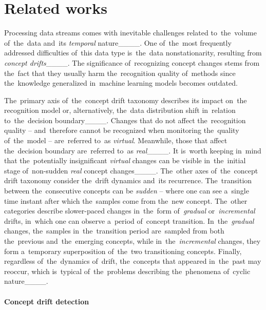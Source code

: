 \section{Related works}
\label{sec-related}

Processing data streams comes with inevitable challenges related to~the~volume of~the~data and~its \textit{temporal} nature____. One of~the~most frequently addressed difficulties of~this data type is~the~data nonstationarity, resulting from \textit{concept drifts}____. The significance of~recognizing concept changes stems from the~fact that they usually harm the~recognition quality of~methods since the~knowledge generalized in~machine learning models becomes outdated. 

The~primary axis of~the~concept drift taxonomy describes its impact on~the recognition model or, alternatively, the~data distribution shift in~relation to~the~decision boundary____. Changes that do not affect the~recognition quality -- and~therefore cannot be recognized when monitoring the~quality of~the~model -- are~referred to~as \textit{virtual}. Meanwhile, those that affect the~decision boundary are~referred to~as \textit{real}____. It is~worth keeping in~mind that the~potentially insignificant \textit{virtual} changes can be visible in~the~initial stage of~non-sudden \textit{real} concept changes____. The~other axes of~the~concept drift taxonomy consider the~drift dynamics and~its recurrence. The~transition between the~consecutive concepts can be \textit{sudden} -- where one can see a~single time instant after which the~samples come from the~new concept. The~other categories describe slower-paced changes in~the~form of~\textit{gradual} or~\textit{incremental} drifts, in~which one can observe a~period of~concept transition. In~the~\textit{gradual} changes, the~samples in~the~transition period are~sampled from both the~previous and~the~emerging concepts, while in~the~\textit{incremental} changes, they form a~temporary superposition of~the~two transitioning concepts. Finally, regardless of~the~dynamics of~drift, the~concepts that appeared in~the~past may reoccur, which is~typical of~the~problems describing the~phenomena of~cyclic nature____.

\paragraph{Concept drift detection}

